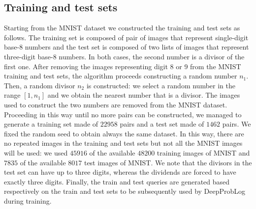 


\subsection{Training and test sets}
Starting from the MNIST dataset we constructed the training and test sets as follows. The training set is composed of pair of images that represent single-digit base-8 numbers and the test set is composed of two lists of images that represent three-digit base-8 numbers. In both cases, the second number is a divisor of the first one. 
After removing the images representing digit 8 or 9 from the MNIST training and test sets, the algorithm proceeds constructing a random number $n_1$. Then, a random divisor $n_2$ is constructed: we select a random number in the range $[1,n_1]$ and we obtain the nearest number that is a divisor. The images used to construct the two numbers are removed from the MNIST dataset. Proceeding in this way until no more pairs can be constructed, we managed to generate a training set made of $22958$ pairs and a test set made of $1462$ pairs. We fixed the random seed to obtain always the same dataset. In this way, there are no repeated images in the training and test sets but not all the MNIST images will be used: we used $45916$ of the available $48200$ training images of MNIST and $7835$ of the available $8017$ test images of MNIST. We note that the divisors in the test set can have up to three digits, whereas the dividends are forced to have exactly three digits.
Finally, the train and test queries are generated based respectively on the train and test sets to be subsequently used by DeepProbLog during training.

